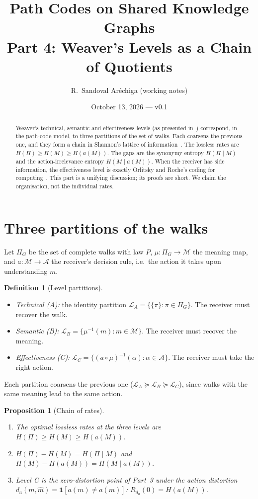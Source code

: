 \documentclass[11pt]{article}
\title{Path Codes on Shared Knowledge Graphs\\[2pt]\large Part 4: Weaver's Levels as a Chain of Quotients}
\author{R.~Sandoval Ar\'echiga (working notes)}
\date{October 13, 2026 --- v0.1}
\newtheorem{proposition}{Proposition}
\theoremstyle{definition}
\newtheorem{definition}{Definition}
\theoremstyle{remark}
\newcommand{\M}{\mathcal{M}}
\newcommand{\A}{\mathcal{A}}
\newcommand{\Pset}{\Pi}
\begin{document}
\maketitle

\begin{abstract}
Weaver's technical, semantic and effectiveness levels (as presented in~\cite{gunduz2023}) correspond, in the path-code model, to three partitions of the set of walks. Each coarsens the previous one, and they form a chain in Shannon's lattice of information~\cite{shannon1953}. The lossless rates are $H(\Pi)\ge H(M)\ge H(a(M))$. The gaps are the synonymy entropy $H(\Pi\mid M)$ and the action-irrelevance entropy $H(M\mid a(M))$. When the receiver has side information, the effectiveness level is exactly Orlitsky and Roche's coding for computing~\cite{orlitsky2001}. This part is a unifying discussion; its proofs are short. We claim the organisation, not the individual rates.
\end{abstract}

\section{Three partitions of the walks}

Let $\Pset_G$ be the set of complete walks with law $P$, $\mu:\Pset_G\to\M$ the meaning map, and $a:\M\to\A$ the receiver's decision rule, i.e.\ the action it takes upon understanding $m$.

\begin{definition}[Level partitions]
\begin{itemize}
\item \emph{Technical (A):} the identity partition $\mathcal{L}_A=\{\{\pi\}:\pi\in\Pset_G\}$. The receiver must recover the walk.
\item \emph{Semantic (B):} $\mathcal{L}_B=\{\mu^{-1}(m):m\in\M\}$. The receiver must recover the meaning.
\item \emph{Effectiveness (C):} $\mathcal{L}_C=\{(a\circ\mu)^{-1}(\alpha):\alpha\in\A\}$. The receiver must take the right action.
\end{itemize}
\end{definition}

Each partition coarsens the previous one ($\mathcal{L}_A\succeq\mathcal{L}_B\succeq\mathcal{L}_C$), since walks with the same meaning lead to the same action.

\begin{proposition}[Chain of rates]\label{prop:chain}
\begin{enumerate}
\item[(i)] The optimal lossless rates at the three levels are $H(\Pi)\ge H(M)\ge H(a(M))$.
\item[(ii)] $H(\Pi)-H(M)=H(\Pi\mid M)$ and $H(M)-H(a(M))=H(M\mid a(M))$.
\item[(iii)] Level C is the zero-distortion point of Part~3 under the \emph{action distortion} $d_a(m,\hat m)=\mathbf{1}[a(m)\neq a(\hat m)]$: $R_{d_a}(0)=H(a(M))$.
\end{enumerate}
\end{proposition}
\end{document}

